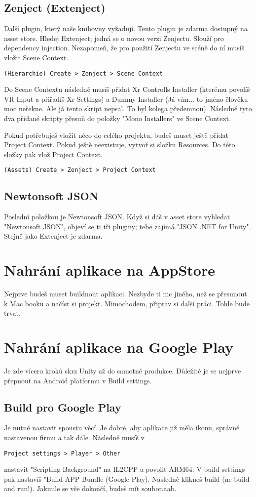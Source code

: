 \documentclass{article}
\begin{document}
\subsection{Zenject (Extenject)}
Další plugin, který naše knihovny vyžadují. Tento plugin je zdarma dostupný na asset store. Hledej Extenject; jedná se o novou verzi Zenjectu. Slouží pro dependency injection.
Nezapomeň, že pro použití Zenjectu ve scéně do ní musíš vložit Scene Context.
\begin{lstlisting}
(Hierarchie) Create > Zenject > Scene Context
\end{lstlisting}
Do Scene Contextu následně musíš přidat Xr Controlls Installer (kterému povolíš VR Input a přiřadíš Xr Settings) a Dummy Installer (Já vím... to jméno člověku moc neřekne. Ale já tento skript nepsal. To byl kolega předemnou). Následně tyto dva přidané skripty přesuň do položky "Mono Installers" ve Scene Context.

Pokud potřebuješ vložit něco do celého projektu, budeš muset ještě přidat Project Context. Pokud ještě neexistuje, vytvoř si složku Resources. Do této složky pak vlož Project Context.
\begin{lstlisting}
(Assets) Create > Zenject > Project Context
\end{lstlisting}

\subsection{Newtonsoft JSON}
Poslední položkou je Newtonsoft JSON. Když si dáš v asset store vyhledat "Newtonsoft JSON", objeví se ti tři pluginy; tebe zajímá "JSON .NET for Unity". Stejně jako Extenject je zdarma.

\pagebreak

\section{Nahrání aplikace na AppStore}
Nejprve budeš muset buildnout aplikaci. Nezbyde ti nic jiného, než se přesunout k Mac booku a načíst si projekt. Mimochodem, připrav si další práci. Tohle bude trvat.
\pagebreak

\section{Nahrání aplikace na Google Play}
Je zde vícero kroků skrz Unity až do samotné produkce. Důležité je se nejprve přepnout na Android platformu v Build settings.
\subsection{Build pro Google Play}
Je nutné nastavit spoustu věcí. Je dobré, aby aplikace již měla ikonu, správně nastavenou firmu a tak dále.
Následně musíš v 
\begin{lstlisting}
Project settings > Player > Other
\end{lstlisting}
nastavit "Scripting Background" na IL2CPP a povolit ARM64.
V build settings pak nastavíš "Build APP Bundle (Google Play).
Následně klikneš build (ne build and run!). Jakmile se vše dokončí, budeš mít soubor.aab.
\end{document}
